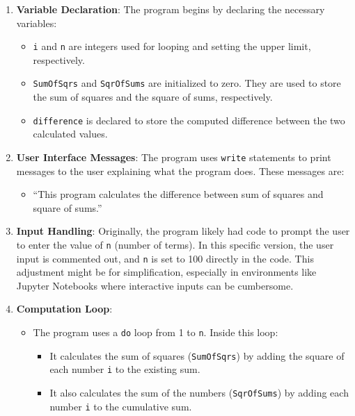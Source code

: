 \begin{enumerate}
\item \textbf{Variable Declaration}: The program begins by declaring the necessary variables:

\begin{itemize}
\item \texttt{i} and \texttt{n} are integers used for looping and setting the upper limit, respectively.
\item \texttt{SumOfSqrs} and \texttt{SqrOfSums} are initialized to zero. They are used to store the sum of squares and the square of sums, respectively.
\item \texttt{difference} is declared to store the computed difference between the two calculated values.
\end{itemize}


\item \textbf{User Interface Messages}: The program uses \texttt{write} statements to print messages to the user explaining what the program does. These messages are:

\begin{itemize}
\item ``This program calculates the difference between sum of squares and square of sums.''
\end{itemize}


\item \textbf{Input Handling}: Originally, the program likely had code to prompt the user to enter the value of \texttt{n} (number of terms). In this specific version, the user input is commented out, and \texttt{n} is set to 100 directly in the code. This adjustment might be for simplification, especially in environments like Jupyter Notebooks where interactive inputs can be cumbersome.
\item \textbf{Computation Loop}:

\begin{itemize}
\item The program uses a \texttt{do} loop from 1 to \texttt{n}. Inside this loop:

\begin{itemize}
\item It calculates the sum of squares (\texttt{SumOfSqrs}) by adding the square of each number \texttt{i} to the existing sum.
\item It also calculates the sum of the numbers (\texttt{SqrOfSums}) by adding each number \texttt{i} to the cumulative sum.
\end{itemize}
\end{itemize}



\end{enumerate}
